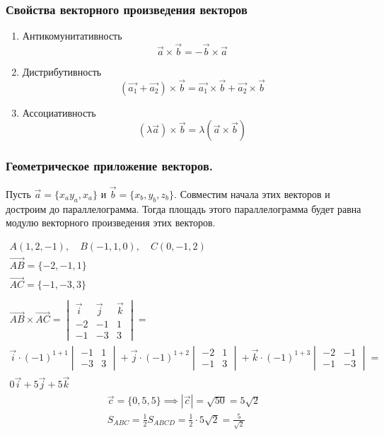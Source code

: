 \subsubsection{Свойства векторного произведения векторов}

\begin{enumerate}
  \item Антикомунитативность \[
    \vec{a} \times \vec{b} = - \vec{b} \times \vec{a}
  \] 
\item Дистрибутивность \[
    \left( \vec{a_1} + \vec{a_2} \right) \times \vec{b} = \vec{a_1} \times \vec{b} + \vec{a_2} \times  \vec{b} 
  \]  
  \item Ассоциативность \[
    \left( \lambda \vec{a} \right) \times \vec{b} = \lambda \left( \vec{a} \times \vec{b} \right)  
  \]
\end{enumerate}

\subsubsection{Геометрическое приложение векторов.}
Пусть $\vec{a} = \{x_a y_a, x_a\}$ и $\vec{b} = \{x_b, y_b, z_b\}$. Совместим начала этих векторов и достроим до параллелограмма. Тогда площадь этого параллелограмма будет равна модулю векторного произведения этих векторов.

\begin{eg}
  \begin{gather*}
    A(1, 2, -1), \quad B(-1, 1, 0), \quad C(0, -1, 2) \\
    \overrightarrow{AB} = \{-2, -1, 1\} \\
    \overrightarrow{AC} = \{-1, -3, 3\} \\
    \\
    \overrightarrow{AB} \times \overrightarrow{AC} = 
    \begin{vmatrix}
      \vec{i} & \vec{j} & \vec{k} \\
      -2 & -1 & 1 \\
      -1 & -3 & 3
    \end{vmatrix} = \\
    \vec{i} \cdot (-1)^{1+1}
    \begin{vmatrix}
      -1 & 1 \\
      -3 & 3
    \end{vmatrix} +
    \vec{j} \cdot (-1)^{1+2} 
    \begin{vmatrix}
      -2 & 1 \\
      -1 & 3
    \end{vmatrix} +
    \vec{k} \cdot (-1)^{1+3}
    \begin{vmatrix}
      -2 & -1 \\
      -1 & -3
    \end{vmatrix} =\\
    0 \vec{i} + 5 \vec{j} + 5 \vec{k}
  \end{gather*}
  \begin{gather*}
    \vec{c} = \{0, 5, 5\} \implies |\vec{c}| = \sqrt{50} = 5\sqrt{2} \\
    S_{ABC} = \frac{1}{2} S_{ABCD} = \frac{1}{2} \cdot 5\sqrt{2} = \frac{5}{\sqrt{2}} 
  \end{gather*} 
\end{eg}

